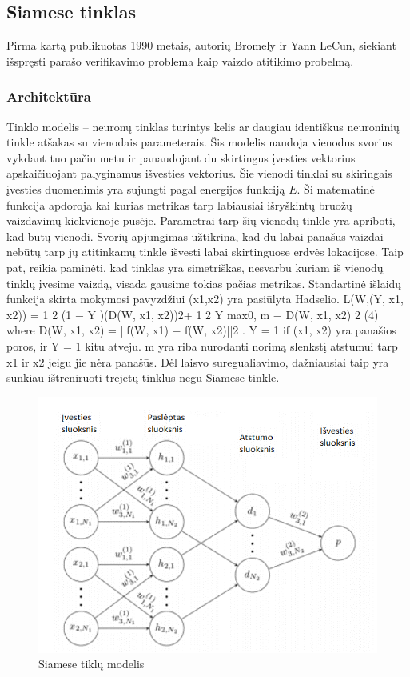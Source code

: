 \documentclass{VUMIFPSkursinis}
\begin{document}
\subsection{Siamese tinklas}
Pirma kartą publikuotas 1990 metais, autorių Bromely ir Yann LeCun, siekiant išspręsti parašo verifikavimo problema kaip vaizdo atitikimo probelmą\cite{Siamese_signature_verifiction}.
\subsubsection{Architektūra}
Tinklo modelis – neuronų tinklas turintys kelis ar daugiau identiškus neuroninių tinkle atšakas su vienodais parameterais\cite{Siamese_Network}. Šis modelis naudoja vienodus svorius vykdant tuo pačiu metu ir panaudojant du skirtingus įvesties vektorius apskaičiuojant palyginamus išvesties vektorius. Šie vienodi tinklai su skiringais įvesties duomenimis yra sujungti pagal energijos funkciją $E$. Ši matematinė funkcija apdoroja kai kurias metrikas tarp labiausiai išryškintų bruožų vaizdavimų kiekvienoje pusėje.
Parametrai tarp šių vienodų tinkle yra apriboti, kad būtų vienodi. Svorių apjungimas užtikrina, kad du labai panašūs vaizdai nebūtų tarp jų atitinkamų tinkle išvesti labai skirtinguose erdvės lokacijose. Taip pat, reikia paminėti, kad tinklas yra simetriškas, nesvarbu kuriam iš vienodų tinklų įvesime vaizdą, visada gausime tokias pačias metrikas.
Standartinė išlaidų funkcija skirta mokymosi pavyzdžiui (x1,x2) yra pasiūlyta Hadselio. L(W,(Y, x1, x2)) = 1 2 (1 − Y )(D(W, x1, x2))2+ 1 2 Y max{0, m − D(W, x1, x2)} 2 (4) where D(W, x1, x2) = ||f(W, x1) − f(W, x2)||2 . Y = 1 if (x1, x2) yra panašios poros, ir Y = 1 kitu atveju. m yra riba nurodanti norimą slenkstį atstumui tarp x1 ir x2 jeigu jie nėra panašūs. Dėl laisvo suregualiavimo, dažniausiai taip yra sunkiau ištreniruoti trejetų tinklus negu Siamese tinkle.

\begin{figure}[H]
\centering
\includegraphics[scale=1.0]{img/Siamese}
\caption{Siamese tiklų modelis} %
\label{img:mlp}
\end{figure}
\end{document}

